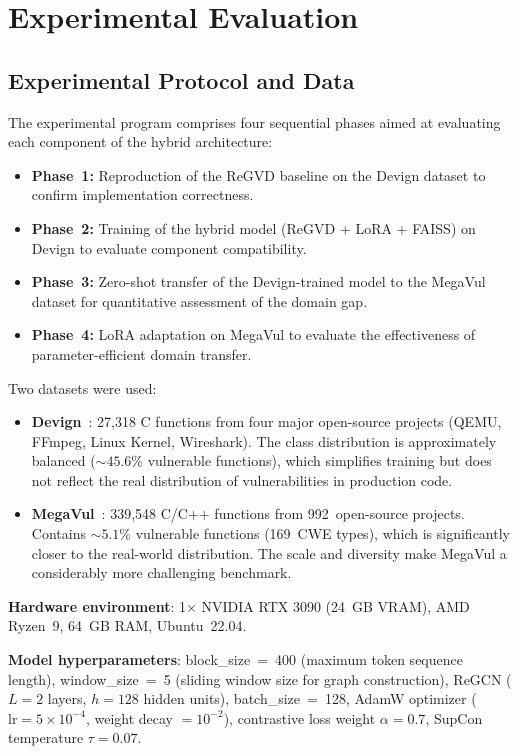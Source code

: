 \documentclass[runningheads]{llncs}
\begin{document}
\section{Experimental Evaluation}

\subsection{Experimental Protocol and Data}

The experimental program comprises four sequential phases aimed at evaluating each component of the hybrid architecture:

\begin{itemize}
    \item \textbf{Phase~1:} Reproduction of the ReGVD baseline on the Devign dataset to confirm implementation correctness.
    \item \textbf{Phase~2:} Training of the hybrid model (ReGVD + LoRA + FAISS) on Devign to evaluate component compatibility.
    \item \textbf{Phase~3:} Zero-shot transfer of the Devign-trained model to the MegaVul dataset for quantitative assessment of the domain gap.
    \item \textbf{Phase~4:} LoRA adaptation on MegaVul to evaluate the effectiveness of parameter-efficient domain transfer.
\end{itemize}

Two datasets were used:
\begin{itemize}
    \item \textbf{Devign}~\cite{zhou2019devign}: 27,318 C functions from four major open-source projects (QEMU, FFmpeg, Linux Kernel, Wireshark). The class distribution is approximately balanced (${\sim}45.6$\% vulnerable functions), which simplifies training but does not reflect the real distribution of vulnerabilities in production code.
    \item \textbf{MegaVul}~\cite{ni2024megavul}: 339,548 C/C++ functions from 992~open-source projects. Contains ${\sim}5.1$\% vulnerable functions (169~CWE types), which is significantly closer to the real-world distribution. The scale and diversity make MegaVul a considerably more challenging benchmark.
\end{itemize}

\textbf{Hardware environment}: 1$\times$ NVIDIA RTX 3090 (24~GB VRAM), AMD Ryzen~9, 64~GB RAM, Ubuntu~22.04.

\textbf{Model hyperparameters}: block\_size~=~400 (maximum token sequence length), window\_size~=~5 (sliding window size for graph construction), ReGCN ($L{=}2$ layers, $h{=}128$ hidden units), batch\_size~=~128, AdamW optimizer ($\text{lr} = 5 \times 10^{-4}$, weight decay $= 10^{-2}$), contrastive loss weight $\alpha = 0.7$, SupCon temperature $\tau = 0.07$.
\end{document}
